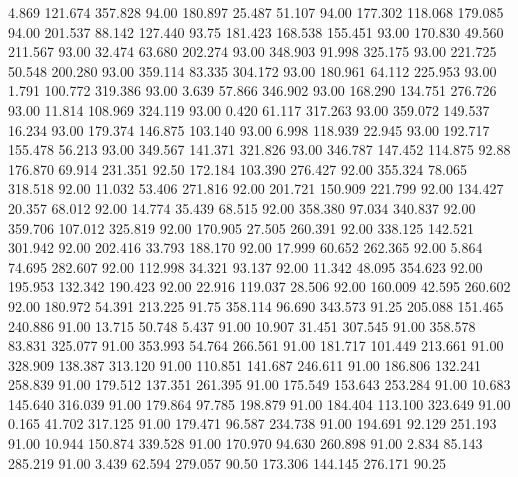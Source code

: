    4.869  121.674  357.828        94.00
 180.897   25.487   51.107        94.00
 177.302  118.068  179.085        94.00
 201.537   88.142  127.440        93.75
 181.423  168.538  155.451        93.00
 170.830   49.560  211.567        93.00
  32.474   63.680  202.274        93.00
 348.903   91.998  325.175        93.00
 221.725   50.548  200.280        93.00
 359.114   83.335  304.172        93.00
 180.961   64.112  225.953        93.00
   1.791  100.772  319.386        93.00
   3.639   57.866  346.902        93.00
 168.290  134.751  276.726        93.00
  11.814  108.969  324.119        93.00
   0.420   61.117  317.263        93.00
 359.072  149.537   16.234        93.00
 179.374  146.875  103.140        93.00
   6.998  118.939   22.945        93.00
 192.717  155.478   56.213        93.00
 349.567  141.371  321.826        93.00
 346.787  147.452  114.875        92.88
 176.870   69.914  231.351        92.50
 172.184  103.390  276.427        92.00
 355.324   78.065  318.518        92.00
  11.032   53.406  271.816        92.00
 201.721  150.909  221.799        92.00
 134.427   20.357   68.012        92.00
  14.774   35.439   68.515        92.00
 358.380   97.034  340.837        92.00
 359.706  107.012  325.819        92.00
 170.905   27.505  260.391        92.00
 338.125  142.521  301.942        92.00
 202.416   33.793  188.170        92.00
  17.999   60.652  262.365        92.00
   5.864   74.695  282.607        92.00
 112.998   34.321   93.137        92.00
  11.342   48.095  354.623        92.00
 195.953  132.342  190.423        92.00
  22.916  119.037   28.506        92.00
 160.009   42.595  260.602        92.00
 180.972   54.391  213.225        91.75
 358.114   96.690  343.573        91.25
 205.088  151.465  240.886        91.00
  13.715   50.748    5.437        91.00
  10.907   31.451  307.545        91.00
 358.578   83.831  325.077        91.00
 353.993   54.764  266.561        91.00
 181.717  101.449  213.661        91.00
 328.909  138.387  313.120        91.00
 110.851  141.687  246.611        91.00
 186.806  132.241  258.839        91.00
 179.512  137.351  261.395        91.00
 175.549  153.643  253.284        91.00
  10.683  145.640  316.039        91.00
 179.864   97.785  198.879        91.00
 184.404  113.100  323.649        91.00
   0.165   41.702  317.125        91.00
 179.471   96.587  234.738        91.00
 194.691   92.129  251.193        91.00
  10.944  150.874  339.528        91.00
 170.970   94.630  260.898        91.00
   2.834   85.143  285.219        91.00
   3.439   62.594  279.057        90.50
 173.306  144.145  276.171        90.25
